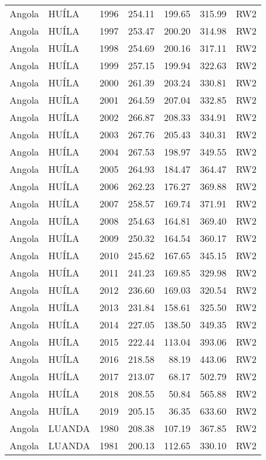 \begin{longtable}{lllrrrl}
  Angola & HUÍLA & 1996 & 254.11 & 199.65 & 315.99 & RW2 \\ 
  Angola & HUÍLA & 1997 & 253.47 & 200.20 & 314.98 & RW2 \\ 
  Angola & HUÍLA & 1998 & 254.69 & 200.16 & 317.11 & RW2 \\ 
  Angola & HUÍLA & 1999 & 257.15 & 199.94 & 322.63 & RW2 \\ 
  Angola & HUÍLA & 2000 & 261.39 & 203.24 & 330.81 & RW2 \\ 
  Angola & HUÍLA & 2001 & 264.59 & 207.04 & 332.85 & RW2 \\ 
  Angola & HUÍLA & 2002 & 266.87 & 208.33 & 334.91 & RW2 \\ 
  Angola & HUÍLA & 2003 & 267.76 & 205.43 & 340.31 & RW2 \\ 
  Angola & HUÍLA & 2004 & 267.53 & 198.97 & 349.55 & RW2 \\ 
  Angola & HUÍLA & 2005 & 264.93 & 184.47 & 364.47 & RW2 \\ 
  Angola & HUÍLA & 2006 & 262.23 & 176.27 & 369.88 & RW2 \\ 
  Angola & HUÍLA & 2007 & 258.57 & 169.74 & 371.91 & RW2 \\ 
  Angola & HUÍLA & 2008 & 254.63 & 164.81 & 369.40 & RW2 \\ 
  Angola & HUÍLA & 2009 & 250.32 & 164.54 & 360.17 & RW2 \\ 
  Angola & HUÍLA & 2010 & 245.62 & 167.65 & 345.15 & RW2 \\ 
  Angola & HUÍLA & 2011 & 241.23 & 169.85 & 329.98 & RW2 \\ 
  Angola & HUÍLA & 2012 & 236.60 & 169.03 & 320.54 & RW2 \\ 
  Angola & HUÍLA & 2013 & 231.84 & 158.61 & 325.50 & RW2 \\ 
  Angola & HUÍLA & 2014 & 227.05 & 138.50 & 349.35 & RW2 \\ 
  Angola & HUÍLA & 2015 & 222.44 & 113.04 & 393.06 & RW2 \\ 
  Angola & HUÍLA & 2016 & 218.58 & 88.19 & 443.06 & RW2 \\ 
  Angola & HUÍLA & 2017 & 213.07 & 68.17 & 502.79 & RW2 \\ 
  Angola & HUÍLA & 2018 & 208.55 & 50.84 & 565.88 & RW2 \\ 
  Angola & HUÍLA & 2019 & 205.15 & 36.35 & 633.60 & RW2 \\ 
  Angola & LUANDA & 1980 & 208.38 & 107.19 & 367.85 & RW2 \\ 
  Angola & LUANDA & 1981 & 200.13 & 112.65 & 330.10 & RW2 \\ 

\end{longtable}
